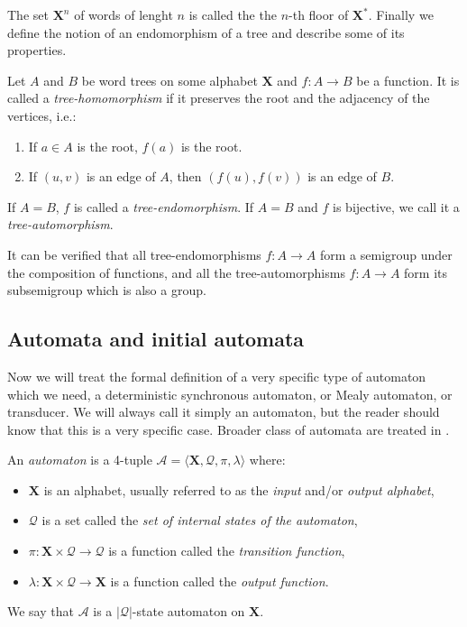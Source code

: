 \documentclass[mat1]{fmfdeloTS2.0}
\newcommand{\obs}{}				%
\newcommand{\abece}{\mathbf{X}}			%
\newcommand{\fslovar}{\mathbf{X^*}}		%
\newcommand{\auto}{\mathcal}			%
\newcommand{\QQ}{\mathcal{Q}}			%
\begin{document}
The set $\abece^n$ of words of lenght $n$ is called the \obs{the $n$-th floor of $\fslovar$}. Finally we define the notion of an endomorphism of a tree and describe some of its properties.

\begin{definition}\label{def:tree homo}
Let $A$ and $B$ be word trees on some alphabet $\abece$ and $f: A\longrightarrow B$ be a function. It is called a \emph{tree-homomorphism} if it preserves the root and the adjacency of the vertices, i.e.:
\begin{enumerate}
\item If $a\in A$ is the root, $f(a)$ is the root.
\item If $(u,v)$ is an edge of $A$, then $(f(u),f(v))$ is an edge of $B$.
\end{enumerate}
If $A=B$, $f$ is called a \emph{tree-endomorphism}.
If $A=B$ and $f$ is bijective, we call it a \emph{tree-automorphism}.
\end{definition}
It can be verified that all tree-endomorphisms $f:A\longrightarrow A$ form a \obs{semigroup} under the composition of functions, and all the tree-automorphisms $f:A\longrightarrow A$ form its subsemigroup which is also a \obs{group}.

\subsection{Automata and initial automata}
Now we will treat the formal definition of a very specific type of automaton which we need, a \obs{deterministic synchronous automaton}, or \obs{Mealy automaton}, or \obs{transducer}. We will always call it simply an \obs{automaton}, but the reader should know that this is a \obs{very specific} case. Broader class of automata are treated in \cite{4,11}.

\begin{definition}
An \emph{automaton} is a 4-tuple $\auto{A}=\langle\abece,\QQ,\pi,\lambda\rangle$ where:
\begin{itemize}
	\item $\abece$ is an alphabet, usually referred to as the \emph{input} and/or \emph{output alphabet},
	\item $\QQ$ is a set called the \emph{set of internal states of the automaton},
	\item $\pi:\abece\times\QQ \longrightarrow \QQ $ is a function called the \emph{transition function},
	\item $\lambda:\abece\times\QQ \longrightarrow \abece $ is a function called the \emph{output function}.
\end{itemize}
We say that $\auto{A}$ is a \obs{$|\QQ|$-state} automaton \obs{on $\abece$}.
\end{definition}
\end{document}

